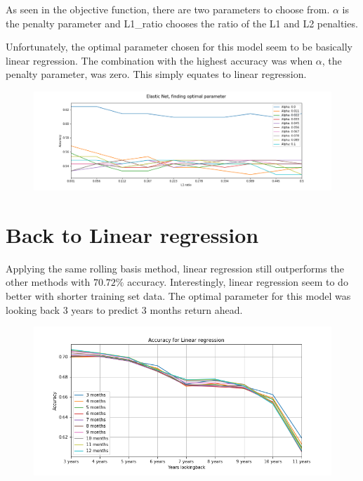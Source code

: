\documentclass[]{scrartcl}
\begin{document}
As seen in the objective function, there are two parameters to choose from. $\alpha$ is the penalty parameter and L1\_ratio chooses the ratio of the L1 and L2 penalties.  
  
Unfortunately, the optimal parameter chosen for this model seem to be basically linear regression. The combination with the highest accuracy was when $\alpha$, the penalty parameter, was zero. This simply equates to linear regression.
\begin{figure}[htb]
	\includegraphics[scale=0.5]{Elastic_regression_cant_beat_linear_reg.png}
\end{figure}

\section*{Back to Linear regression}
Applying the same rolling basis method, linear regression still outperforms the other methods with $70.72\%$ accuracy. Interestingly, linear regression seem to do better with shorter training set data. The optimal parameter for this model was looking back 3 years to predict 3 months return ahead.

\begin{figure}[htb]
	\includegraphics[scale=0.7]{Linear_regression_param.png}
\end{figure}
\end{document}

